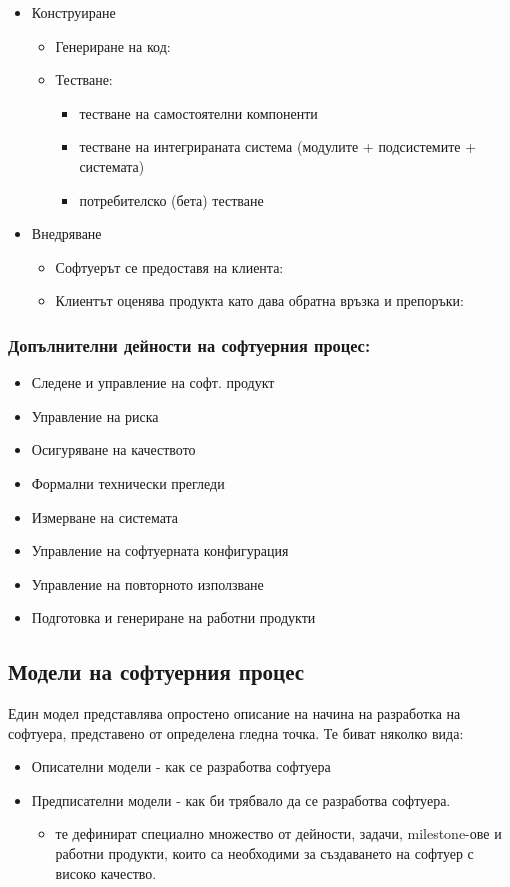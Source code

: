 \documentclass[fleqn,12pt]{article}
\begin{document}
\begin{itemize}
	\item Конструиране
	\begin{itemize}
		\item Генериране на код:
		\item Тестване:
		\begin{itemize}
			\item тестване на самостоятелни компоненти
			\item тестване на интегрираната система (модулите + подсистемите + системата)
			\item потребителско (бета) тестване
		\end{itemize}
	\end{itemize}


	\item Внедряване
	\begin{itemize}
		\item Софтуерът се предоставя на клиента:
		\item Клиентът оценява продукта като дава обратна връзка и препоръки:
	\end{itemize}
\end{itemize}

\subsubsection{Допълнителни дейности на софтуерния процес:}
\begin{itemize}
	\item Следене и управление на софт. продукт
	\item Управление на риска
	\item Осигуряване на качеството
	\item Формални технически прегледи
	\item Измерване на системата
	\item Управление на софтуерната конфигурация
	\item Управление на повторното използване
	\item Подготовка и генериране на работни продукти
\end{itemize}

\subsection{Модели на софтуерния процес}
Един модел представлява опростено описание на начина на разработка на софтуера, представено от определена гледна точка. Те биват няколко вида:

\begin{itemize}
	\item Описателни модели - как се разработва софтуера
	\item Предписателни модели - как би трябвало да се разработва софтуера.
	\begin{itemize}
		\item те дефинират специално множество от дейности, задачи, milestone-ове и работни продукти, които са необходими за създаването на софтуер с високо качество.
	\end{itemize}
\end{itemize}
\end{document}

